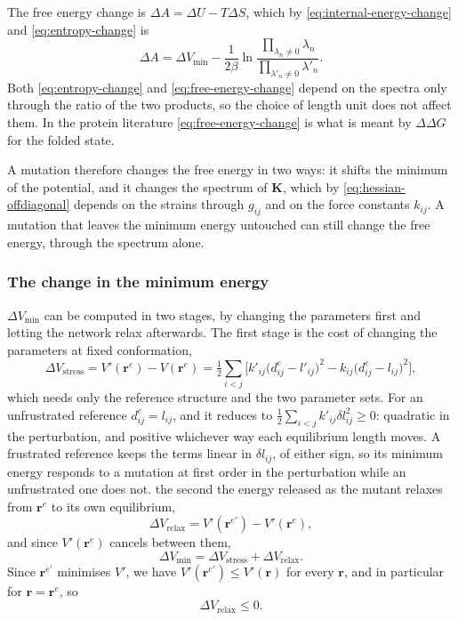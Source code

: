 \documentclass[11pt]{article}
\newcommand{\rr}{\mathbf{r}}
\newcommand{\KK}{\mathbf{K}}
\newcommand{\re}{\rr^{e}}
\newcommand{\rem}{\rr^{e\prime}}   %
\newcommand{\dije}{d^{e}_{ij}}
\newcommand{\lijm}{l'_{ij}}
\newcommand{\kijm}{k'_{ij}}
\newcommand{\dlij}{\delta l_{ij}}
\newcommand{\gij}{g_{ij}}
\newcommand{\lij}{l_{ij}}
\newcommand{\kij}{k_{ij}}
\begin{document}
The free energy change is $\Delta A = \Delta U - T\Delta S$, which by \eqref{eq:internal-energy-change} and \eqref{eq:entropy-change} is
\begin{equation}
\boxed{
\Delta A = \Delta V_{\min} - \frac{1}{2\beta} \ln
\frac{\prod_{\lambda_n \ne 0} \lambda_n}{\prod_{\lambda'_n \ne 0} \lambda'_n} .
}
\label{eq:free-energy-change}
\end{equation}
Both \eqref{eq:entropy-change} and \eqref{eq:free-energy-change} depend on the spectra only through the ratio of the two products, so the choice of length unit does not affect them.
In the protein literature \eqref{eq:free-energy-change} is what is meant by $\Delta\Delta G$ for the folded state.

A mutation therefore changes the free energy in two ways: it shifts the minimum of the potential, and it changes the spectrum of $\KK$, which by \eqref{eq:hessian-offdiagonal} depends on the strains through $\gij$ and on the force constants $\kij$.
A mutation that leaves the minimum energy untouched can still change the free energy, through the spectrum alone.

\subsubsection{The change in the minimum energy}

$\Delta V_{\min}$ can be computed in two stages, by changing the parameters first and letting the network relax afterwards.
The first stage is the cost of changing the parameters at fixed conformation,
\begin{equation}
\Delta V_{\text{stress}} = V'(\re) - V(\re)
= \tfrac12 \sum_{i<j} \Big[ \kijm \big(\dije - \lijm\big)^{2}
- \kij \big(\dije - \lij\big)^{2} \Big],
\label{eq:stress-energy}
\end{equation}
which needs only the reference structure and the two parameter sets.
For an unfrustrated reference $\dije = \lij$, and it reduces to
$\tfrac12 \sum_{i<j} \kijm \dlij^{2} \ge 0$: quadratic in the perturbation, and positive whichever way each equilibrium length moves.
A frustrated reference keeps the terms linear in $\dlij$, of either sign, so its minimum energy responds to a mutation at first order in the perturbation while an unfrustrated one does not.
the second the energy released as the mutant relaxes from $\re$ to its own equilibrium,
\begin{equation}
\Delta V_{\text{relax}} = V'(\rem) - V'(\re),
\label{eq:relaxation-energy}
\end{equation}
and since $V'(\re)$ cancels between them,
\begin{equation}
\boxed{
\Delta V_{\min} = \Delta V_{\text{stress}} + \Delta V_{\text{relax}} .
}
\label{eq:minimum-energy-change}
\end{equation}
Since $\rem$ minimises $V'$, we have $V'(\rem) \le V'(\rr)$ for every $\rr$, and in particular for $\rr = \re$, so
\begin{equation}
\Delta V_{\text{relax}} \le 0 .
\end{equation}
\end{document}
